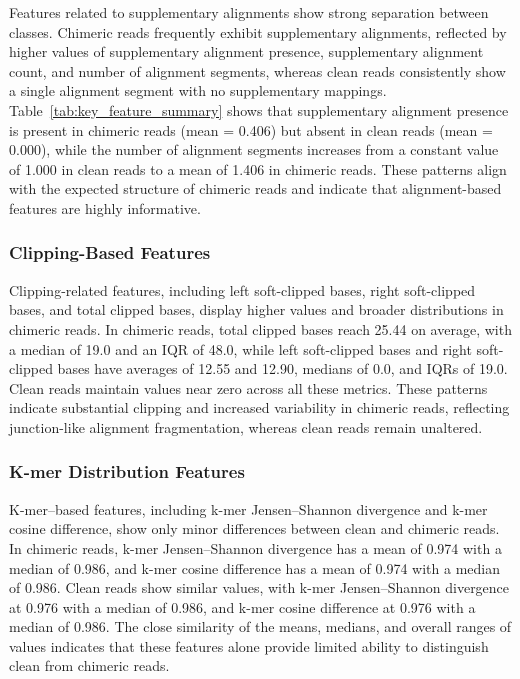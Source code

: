 Features related to supplementary alignments show strong separation between classes. Chimeric reads frequently exhibit supplementary alignments, reflected by higher values of supplementary alignment presence, supplementary alignment count, and number of alignment segments, whereas clean reads consistently show a single alignment segment with no supplementary mappings. Table~\ref{tab:key_feature_summary} shows that supplementary alignment presence is present in chimeric reads (mean = 0.406) but absent in clean reads (mean = 0.000), while the number of alignment segments increases from a constant value of 1.000 in clean reads to a mean of 1.406 in chimeric reads. These patterns align with the expected structure of chimeric reads and indicate that alignment-based features are highly informative.

\subsubsection{Clipping-Based Features}

Clipping-related features, including left soft-clipped bases, right soft-clipped bases, and total clipped bases, display higher values and broader distributions in chimeric reads. In chimeric reads, total clipped bases reach 25.44 on average, with a median of 19.0 and an IQR of 48.0, while left soft-clipped bases and right soft-clipped bases have averages of 12.55 and 12.90, medians of 0.0, and IQRs of 19.0. Clean reads maintain values near zero across all these metrics. These patterns indicate substantial clipping and increased variability in chimeric reads, reflecting junction-like alignment fragmentation, whereas clean reads remain unaltered.

\subsubsection{K-mer Distribution Features}

K-mer--based features, including k-mer Jensen--Shannon divergence and k-mer cosine difference, show only minor differences between clean and chimeric reads. In chimeric reads, k-mer Jensen--Shannon divergence has a mean of 0.974 with a median of 0.986, and k-mer cosine difference has a mean of 0.974 with a median of 0.986. Clean reads show similar values, with k-mer Jensen--Shannon divergence at 0.976 with a median of 0.986, and k-mer cosine difference at 0.976 with a median of 0.986. The close similarity of the means, medians, and overall ranges of values indicates that these features alone provide limited ability to distinguish clean from chimeric reads.

